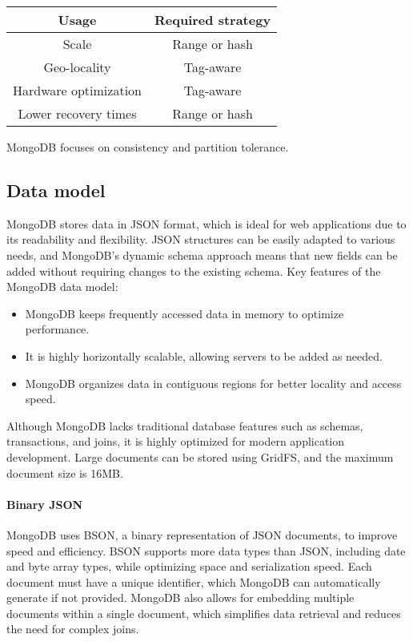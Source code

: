 \begin{table}[!ht]
    \centering
    \begin{tabular}{|c|c|}
        \hline
        \textbf{Usage} & \textbf{Required strategy} \\ \hline
        Scale & Range or hash \\ \hline
        Geo-locality & Tag-aware \\ \hline
        Hardware optimization & Tag-aware \\ \hline
        Lower recovery times & Range or hash \\ \hline
    \end{tabular}
\end{table}
MongoDB focuses on consistency and partition tolerance. 

\subsection{Data model}
MongoDB stores data in JSON format, which is ideal for web applications due to its readability and flexibility. 
JSON structures can be easily adapted to various needs, and MongoDB's dynamic schema approach means that new fields can be added without requiring changes to the existing schema.
Key features of the MongoDB data model: 
\begin{itemize} 
    \item MongoDB keeps frequently accessed data in memory to optimize performance. 
    \item It is highly horizontally scalable, allowing servers to be added as needed. 
    \item MongoDB organizes data in contiguous regions for better locality and access speed.
\end{itemize}
Although MongoDB lacks traditional database features such as schemas, transactions, and joins, it is highly optimized for modern application development. 
Large documents can be stored using GridFS, and the maximum document size is 16MB.

\paragraph*{Binary JSON} 
MongoDB uses BSON, a binary representation of JSON documents, to improve speed and efficiency. 
BSON supports more data types than JSON, including date and byte array types, while optimizing space and serialization speed. 
Each document must have a unique identifier, which MongoDB can automatically generate if not provided.
MongoDB also allows for embedding multiple documents within a single document, which simplifies data retrieval and reduces the need for complex joins.

